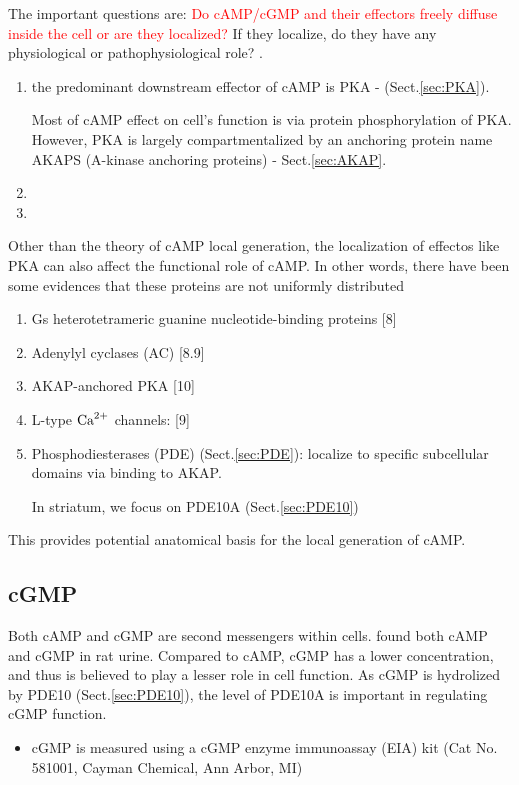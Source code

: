 The important questions are: \textcolor{red}{Do cAMP/cGMP and their effectors
freely diffuse inside the cell or are they localized?} If they localize, do they
have any physiological or pathophysiological role? \citep{fischmeister2006}.


\begin{enumerate}
  \item the predominant downstream effector of cAMP is PKA - (Sect.\ref{sec:PKA}).

Most of cAMP effect on cell's function is via protein phosphorylation of PKA.
However, PKA is largely compartmentalized by an anchoring protein name AKAPS
(A-kinase anchoring proteins) - Sect.\ref{sec:AKAP}.  
   
  \item  
  \item 
\end{enumerate}


Other than the theory of cAMP local generation, the localization of effectos
like PKA can also affect the functional role of cAMP. In other words, there have
been some evidences that these proteins are not uniformly distributed
\begin{enumerate}
  \item Gs heterotetrameric guanine nucleotide-binding proteins [8]
  \item Adenylyl cyclases (AC) [8.9]
  \item AKAP-anchored PKA [10]
  \item L-type ${\text{Ca}^{2+}}$ channels: [9]
  \item Phosphodiesterases (PDE) \citep{Dodge2001} (Sect.\ref{sec:PDE}):
  localize to specific subcellular domains via binding to AKAP.
  
  In striatum, we focus on PDE10A (Sect.\ref{sec:PDE10})
\end{enumerate}
This provides potential anatomical basis for the local generation of cAMP.





\subsection{cGMP}
\label{sec:cGMP}

Both cAMP and cGMP are second messengers
within cells. \citep{Ashmana1963} found both cAMP and cGMP in rat urine.
Compared to cAMP, cGMP has a lower concentration, and thus is believed to play a
lesser role in cell function. As cGMP is hydrolized by PDE10
(Sect.\ref{sec:PDE10}), the level of PDE10A is important in regulating cGMP
function. 
\begin{itemize}
  \item  cGMP is measured using a cGMP enzyme immunoassay (EIA) kit (Cat No.
  581001, Cayman Chemical, Ann Arbor, MI)
\end{itemize}


